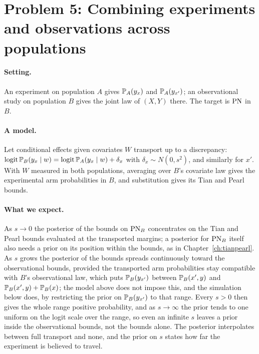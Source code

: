 \section{Problem 5: Combining experiments and observations across populations}

\paragraph{Setting.} An experiment on population $A$ gives $\mathbb{P}_A(y_x)$ and $\mathbb{P}_A(y_{x'})$; an observational study on population $B$ gives the joint law of $(X, Y)$ there. The target is $\mathrm{PN}$ in $B$.

\paragraph{A model.} Let conditional effects given covariates $W$ transport up to a discrepancy: $\operatorname{logit}\mathbb{P}_B(y_x \mid w) = \operatorname{logit}\mathbb{P}_A(y_x \mid w) + \delta_x$ with $\delta_x \sim N(0, s^2)$, and similarly for $x'$. With $W$ measured in both populations, averaging over $B$'s covariate law gives the experimental arm probabilities in $B$, and substitution gives its Tian and Pearl bounds.

\paragraph{What we expect.} As $s \to 0$ the posterior of the bounds on $\mathrm{PN}_B$ concentrates on the Tian and Pearl bounds evaluated at the transported margins; a posterior for $\mathrm{PN}_B$ itself also needs a prior on its position within the bounds, as in Chapter~\ref{ch:tianpearl}. As $s$ grows the posterior of the bounds spreads continuously toward the observational bounds, provided the transported arm probabilities stay compatible with $B$'s observational law, which puts $\mathbb{P}_B(y_{x'})$ between $\mathbb{P}_B(x', y)$ and $\mathbb{P}_B(x', y) + \mathbb{P}_B(x)$; the model above does not impose this, and the simulation below does, by restricting the prior on $\mathbb{P}_B(y_{x'})$ to that range. Every $s > 0$ then gives the whole range positive probability, and as $s \to \infty$ the prior tends to one uniform on the logit scale over the range, so even an infinite $s$ leaves a prior inside the observational bounds, not the bounds alone. The posterior interpolates between full transport and none, and the prior on $s$ states how far the experiment is believed to travel.

